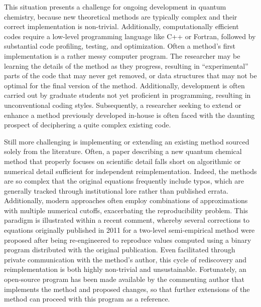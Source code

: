 This situation presents a challenge for ongoing development in quantum chemistry, because new theoretical methods are typically complex and their correct implementation is non-trivial.  Additionally, computationally efficient codes require a low-level programming language like C++ or Fortran, followed by substantial code profiling, testing, and optimization.  Often a method's first implementation is a rather messy computer program. The researcher may be learning the details of the method as they progress, resulting in ``experimental'' parts of the code that may never get removed, or data structures that may not be optimal for the final version of the method.  Additionally, development is often carried out by graduate students not yet proficient in programming, resulting in unconventional coding styles.  Subsequently, a researcher seeking to extend or enhance a method previously developed in-house is often faced with the daunting prospect of deciphering a quite complex existing code.

Still more challenging is implementing or extending an existing method sourced solely from the literature.  Often, a paper describing a new quantum chemical method that properly focuses on scientific detail falls short on algorithmic or numerical detail sufficient for independent reimplementation. Indeed, the methods are so complex that the original equations frequently include typos, which are generally tracked through institutional lore rather than published errata.  Additionally, modern approaches often employ combinations of approximations with multiple numerical cutoffs, exacerbating the reproducibility problem.  This paradigm is illustrated within a recent comment,\cite{Briling:2017:157101} whereby several corrections to equations originally published in 2011 for a two-level semi-empirical method\cite{Laikov:2011:134120} were proposed after being re-engineered to reproduce values computed using a binary program distributed with the original publication.  Even facilitated through private communication with the method's author, this cycle of rediscovery and reimplementation is both highly non-trivial and unsustainable.  Fortunately, an open-source program\cite{brilingqm} has been made available by the commenting author that implements the method and proposed changes, so that further extensions of the method can proceed with this program as a reference.

